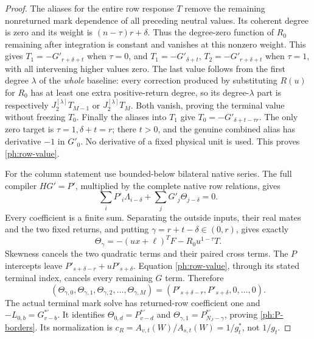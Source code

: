 \documentclass[11pt,a4paper]{amsart}
\numberwithin{equation}{section}
\theoremstyle{plain}
\theoremstyle{definition}
\begin{document}
\begin{proof}
The aliases for the entire row response \(T\) remove the remaining
nonreturned mark dependence of all preceding neutral values.
Its coherent degree is zero and its weight is
\((n-\tau)r+\delta\).
Thus the degree-zero function of \(R_0\) remaining after integration is
constant and vanishes at this nonzero weight.
This gives \(T_1=-G'_{r+\delta+t}\) when \(\tau=0\), and
\(T_1=-G'_{\delta+t}\), \(T_2=-G'_{r+\delta+t}\) when \(\tau=1\),
with all intervening higher values zero.
The last value follows from the first degree \(\lambda\) of the
\emph{whole} baseline: every correction produced by substituting
\(R(u)\) for \(R_0\) has at least one extra positive-return degree, so
its degree-\(\lambda\) part is respectively
\(J_2^{[\lambda]}T_{M-1}\) or \(J_2^{[\lambda]}T_M\).
Both vanish, proving the terminal value without freezing \(T_0\).
Finally the aliases into \(T_1\) give
\(T_0=-G'_{\delta+t-\tau r}\).
The only zero target is \(\tau=1,\delta+t=r\); there \(t>0\), and the
genuine combined alias has derivative \(-1\) in \(G'_0\).
No derivative of a fixed physical unit is used.
This proves \eqref{ph:row-value}.

For the column statement use bounded-below bilateral native series.
The full compiler \(HG'=P'\), multiplied by the complete native row
relations, gives
\[
 \sum_iP'_i\Lambda_{i-\delta}
       +\sum_jG'_j\Theta_{j-\delta}=0.
\]
Every coefficient is a finite sum.  Separating the outside inputs,
their real mates and the two fixed returns, and putting
\(\gamma=r+t-\delta\in(0,r)\), gives exactly
\[
 \Theta_\gamma=-(ux+\ell)^TF-R_0u^{1-\tau}T.
\]
Skewness cancels the two quadratic terms and their paired cross terms.
The \(P\) intercepts leave
\(P'_{s+\delta-r}+uP'_{s+\delta}\).
Equation \eqref{ph:row-value}, through its stated terminal index,
cancels every remaining \(G\) term.  Therefore
\[
 (\Theta_{\gamma,0},\Theta_{\gamma,1},
       \Theta_{\gamma,2},\ldots,\Theta_{\gamma,M})
   =(P'_{s+\delta-r},P'_{s+\delta},0,\ldots,0).
\]
The actual terminal mark solve has returned-row coefficient one and
\(-L_{0,b}=G^{*'}_{v-b}\).  It identifies
\(\Theta_{0,d}=P^{*'}_{v-d}\) and
\(\Theta_{\gamma,1}=P^{*'}_{N_J-\gamma}\), proving
\eqref{ph:P-borders}.  Its normalization is
\(c_R=A_{v,t}(W)/A_{s,t}(W)=1/g_t^*\), not \(1/g_t\).


\end{proof}
\end{document}
